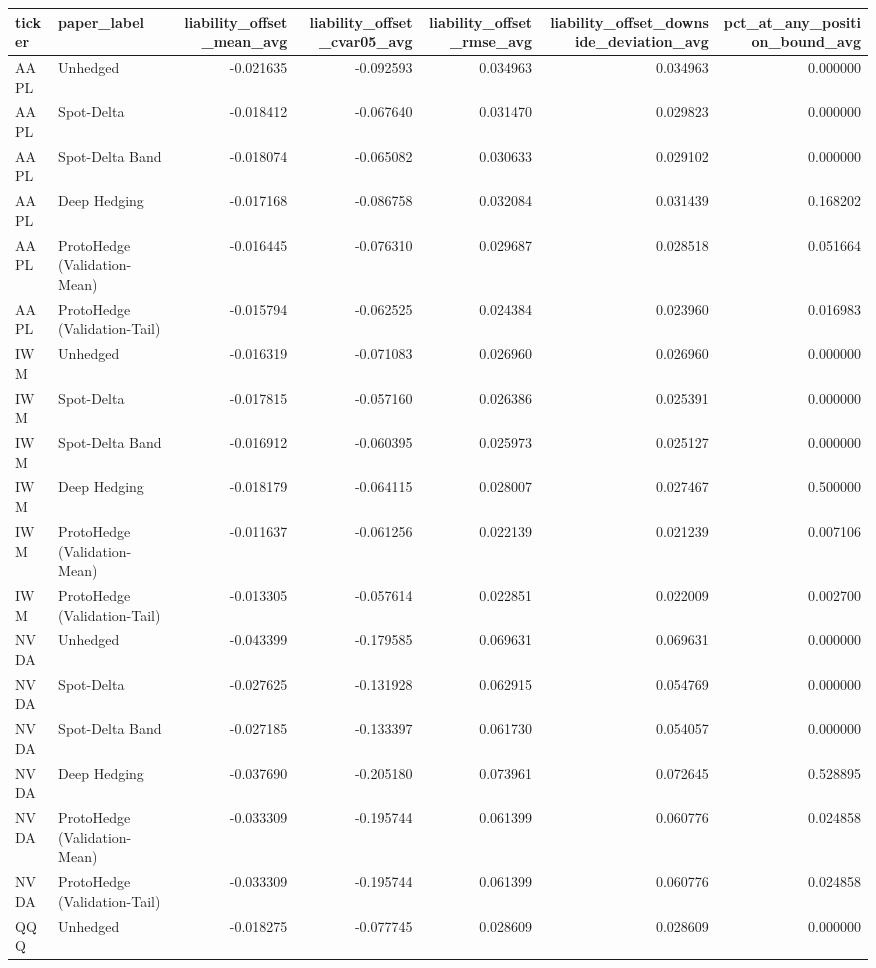 \begin{tabular}{llrrrrr}
\toprule
ticker & paper\_label & liability\_offset\_mean\_avg & liability\_offset\_cvar05\_avg & liability\_offset\_rmse\_avg & liability\_offset\_downside\_deviation\_avg & pct\_at\_any\_position\_bound\_avg \\
\midrule
AAPL & Unhedged & -0.021635 & -0.092593 & 0.034963 & 0.034963 & 0.000000 \\
AAPL & Spot-Delta & -0.018412 & -0.067640 & 0.031470 & 0.029823 & 0.000000 \\
AAPL & Spot-Delta Band & -0.018074 & -0.065082 & 0.030633 & 0.029102 & 0.000000 \\
AAPL & Deep Hedging & -0.017168 & -0.086758 & 0.032084 & 0.031439 & 0.168202 \\
AAPL & ProtoHedge (Validation-Mean) & -0.016445 & -0.076310 & 0.029687 & 0.028518 & 0.051664 \\
AAPL & ProtoHedge (Validation-Tail) & -0.015794 & -0.062525 & 0.024384 & 0.023960 & 0.016983 \\
IWM & Unhedged & -0.016319 & -0.071083 & 0.026960 & 0.026960 & 0.000000 \\
IWM & Spot-Delta & -0.017815 & -0.057160 & 0.026386 & 0.025391 & 0.000000 \\
IWM & Spot-Delta Band & -0.016912 & -0.060395 & 0.025973 & 0.025127 & 0.000000 \\
IWM & Deep Hedging & -0.018179 & -0.064115 & 0.028007 & 0.027467 & 0.500000 \\
IWM & ProtoHedge (Validation-Mean) & -0.011637 & -0.061256 & 0.022139 & 0.021239 & 0.007106 \\
IWM & ProtoHedge (Validation-Tail) & -0.013305 & -0.057614 & 0.022851 & 0.022009 & 0.002700 \\
NVDA & Unhedged & -0.043399 & -0.179585 & 0.069631 & 0.069631 & 0.000000 \\
NVDA & Spot-Delta & -0.027625 & -0.131928 & 0.062915 & 0.054769 & 0.000000 \\
NVDA & Spot-Delta Band & -0.027185 & -0.133397 & 0.061730 & 0.054057 & 0.000000 \\
NVDA & Deep Hedging & -0.037690 & -0.205180 & 0.073961 & 0.072645 & 0.528895 \\
NVDA & ProtoHedge (Validation-Mean) & -0.033309 & -0.195744 & 0.061399 & 0.060776 & 0.024858 \\
NVDA & ProtoHedge (Validation-Tail) & -0.033309 & -0.195744 & 0.061399 & 0.060776 & 0.024858 \\
QQQ & Unhedged & -0.018275 & -0.077745 & 0.028609 & 0.028609 & 0.000000 \\

\end{tabular}
